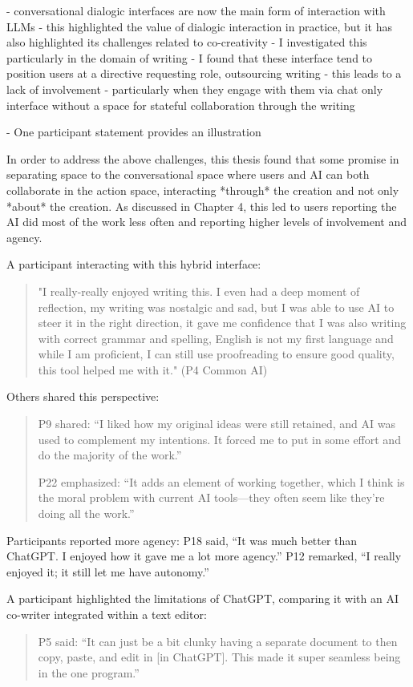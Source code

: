 - conversational dialogic interfaces are now the main form of interaction with LLMs
- this highlighted the value of dialogic interaction in practice, but it has also highlighted its challenges related to co-creativity
- I investigated this particularly in the domain of writing
- I found that these interface tend to position users at a directive requesting role, outsourcing writing 
- this leads to a lack of involvement
- particularly when they engage with them via chat only interface without a space for stateful collaboration through the writing

- One participant statement provides an illustration



In order to address the above challenges, this thesis found that some promise in separating space to the conversational space where users and AI can both collaborate in the action space, interacting *through* the creation and not only *about* the creation. As discussed in Chapter 4, this led to users reporting the AI did most of the work less often and reporting higher levels of involvement and agency. 

A participant interacting with this hybrid interface:
\begin{quote}
"I really-really enjoyed writing this. I even had a deep moment of reflection, my writing was nostalgic and sad, but I was able to use AI to steer it in the right direction, it gave me confidence that I was also writing with correct grammar and spelling, English is not my first language and while I am proficient, I can still use proofreading to ensure good quality, this tool helped me with it." (P4 Common AI)
\end{quote}
Others shared this perspective:
\begin{quote}
P9 shared: “I liked how my original ideas were still retained, and AI was used to complement my intentions. It forced me to put in some effort and do the majority of the work.”

P22 emphasized: “It adds an element of working together, which I think is the moral problem with current AI tools—they often seem like they’re doing all the work.”

\end{quote}


Participants reported more agency: P18 said, “It was much better than ChatGPT. I enjoyed how it gave me a lot more agency.” P12 remarked, “I really enjoyed it; it still let me have autonomy.”

A participant highlighted the limitations of ChatGPT, comparing it with an AI co-writer integrated within a text editor:
\begin{quote}
P5 said: “It can just be a bit clunky having a separate document to then copy, paste, and edit in [in ChatGPT]. This made it super seamless being in the one program.”
\end{quote}




